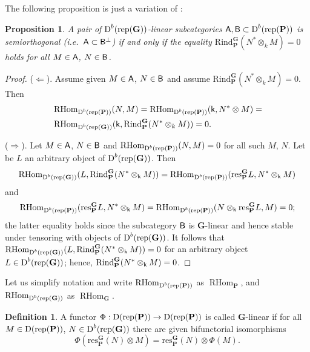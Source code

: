 \documentclass[sn-mathphys-num]{sn-jnl}%
\newcommand{\subsetq}{\subset}
\newcommand{\rep}{{\mathrm{rep}}}
\newcommand{\res}{{\mathrm{res}}}
\newcommand{\Rind}{{\mathrm{Rind}}}
\newcommand*{\Dd}{\mathop{\mathrm D\kern0pt}\nolimits}
\newcommand*{\RHom}{\mathop{\mathrm {RHom}}\nolimits}
\newcommand{\sk}{{\sf k}}
\newcommand{\bg}{\mathbf G}
\newcommand{\bp}{\mathbf P}
\newtheorem{proposition}[theorem]{Proposition}
\theoremstyle{definition}
\newtheorem{definition}[theorem]{Definition}%
\begin{document}
The following proposition is just a variation of \cite[Lemma 2.7]{Kuzbasech}:

\begin{proposition}\label{prop:G-linear_sod}
A pair of $\Dd ^b(\rep ( \bg))$-linear subcategories ${\sf A},{\sf B}\subsetq \Dd ^{b}(\rep( \bp))$ is semiorthogonal (i.e.\  ${\sf A}\subsetq{\sf B}^\perp$) if and only if 
the equality $\Rind_{ \bp}^{ \bg}(N^{\ast}\otimes _k M)=0$ holds for all $M\in {\sf A}$, $N\in {\sf B}$.   
\end{proposition}

\begin{proof}

($\Leftarrow$). Assume given $M\in {\sf A}$, $N\in {\sf B}$ and assume $\Rind_{ \bp}^{ \bg}(N^{\ast}\otimes _k M)=0$. 
Then 
\begin{eqnarray*}&\RHom _{\Dd ^{b}(\rep( \bp))}(N,M)=\RHom _{\Dd ^{b}(\rep( \bp))}(\sk,N^*\otimes M)=\\
&\RHom _{\Dd ^{b}(\rep(\bg))}(\sk,\Rind_{ \bp}^{ \bg}(N^{\ast}\otimes _k M))=0.
\end{eqnarray*}

($\Rightarrow$). Let $M\in {\sf A}$, $N\in {\sf B}$ and 
$\RHom _{\Dd ^{b}(\rep( \bp))}(N,M)=0$ for all such $M$, $N$.
Let be $L$ an arbitrary object of $\Dd ^{b}(\rep( \bg))$. Then 
$$
\RHom _{\Dd ^{b}(\rep( \bg))}(L,\Rind_{ \bp}^{ \bg}(N^{\ast}\otimes _{\sk}M))=\RHom _{\Dd ^{b}(\rep( \bp))}(\res _{ \bp}^{ \bg}L,N^{\ast}\otimes _{\sk}M)
$$
and 
$$
\RHom _{\Dd ^{b}(\rep( \bp))}(\res _{ \bp}^{ \bg}L,N^{\ast}\otimes _{\sk}M)
=\RHom _{\Dd ^{b}(\rep( \bp))}(N\otimes _{\sk}\res _{ \bp}^{ \bg}L,M)=0;
$$
the latter equality holds since the subcategory $\sf B$ is $ \bg$-linear and hence stable under tensoring with objects of $\Dd ^{b}(\rep( \bg))$. 
It follows that $\RHom _{\Dd ^{b}(\rep( \bg))}(L,\Rind_{ \bp}^{ \bg}(N^{\ast}\otimes _{\sk}M))=0$ for an arbitrary object $L\in \Dd ^{b}(\rep( \bg))$; hence, $\Rind_{ \bp}^{ \bg}(N^{\ast}\otimes _{\sk}M)=0$.
\end{proof}
Let us simplify notation and write $\RHom _{ \Dd ^b(\rep( \bp))}$ as $\RHom _{ \bp}$,  and $\RHom _{ \Dd ^b(\rep( \bg))}$ as $\RHom _{ \bg}$.
\begin{definition}
A functor $\Phi: \Dd (\rep( \bp))\rightarrow \Dd (\rep( \bp))$ is called $ \bg$-linear if for all $M \in \Dd (\rep( \bp))$, $N \in \Dd ^b(\rep( \bg))$ there are given bifunctorial isomorphisms 
$$\Phi (\res_{ \bp}^{ \bg}(N)\otimes M)=\res_{ \bp}^{ \bg}(N)\otimes \Phi (M).$$
\end{definition}
\end{document}
